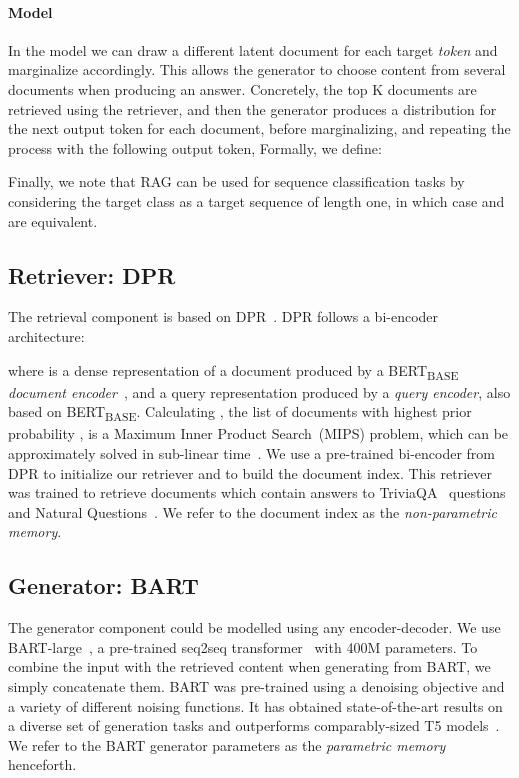 \documentclass{article}
\begin{document}
\paragraph{\ragtoken{} Model}
In the \ragtoken{} model we can draw a different latent document for each target \emph{token} and marginalize accordingly. This allows the generator to choose content from several documents when producing an answer. Concretely, the top K documents are retrieved using the retriever, and then the generator produces a distribution for the next output token for each document, before marginalizing, and repeating the process with the following output token,  Formally, we define:


Finally, we note that RAG can be used for sequence classification tasks by considering the target class as a target sequence of length one, in which case \raganswer{} and \ragtoken{} are equivalent.

\subsection{Retriever: DPR}
The retrieval component  is based on DPR~\cite{Karpukhin20dense}. DPR follows a bi-encoder architecture:
 
where  is a dense representation of a document produced by a BERT\textsubscript{BASE} \emph{document encoder}~\cite{devlin_bert:_2019}, and  a query representation produced by a \emph{query encoder}, also based on  BERT\textsubscript{BASE}. 
Calculating \topk{}, the list of  documents \doc{} with highest prior probability , is a Maximum Inner Product Search~(MIPS) problem, which can be approximately solved in sub-linear time~\cite{JDH17}. 
We use a pre-trained bi-encoder from DPR to initialize our retriever and to build the document index. This retriever was trained to retrieve documents which contain answers to  TriviaQA~\cite{joshi_triviaqa:_2017} questions and Natural Questions~\cite{kwiatkowski_natural_2019}. We refer to the document index as the \emph{non-parametric memory}.

\subsection{Generator: BART}
The generator component  could be modelled using any encoder-decoder. We use BART-large~\cite{lewis2019bart}, a pre-trained seq2seq transformer~\cite{vaswani2017attention} with 400M parameters. To combine the input \query{} with the retrieved content \doc{} when generating from BART, we simply concatenate them.
BART was pre-trained using a denoising objective and a variety of different noising functions. It has obtained state-of-the-art results on a diverse set of generation tasks and outperforms comparably-sized T5 models~\cite{lewis2019bart}. 
We refer to the BART generator parameters \genparam{} as the \emph{parametric memory} henceforth.
\end{document}
